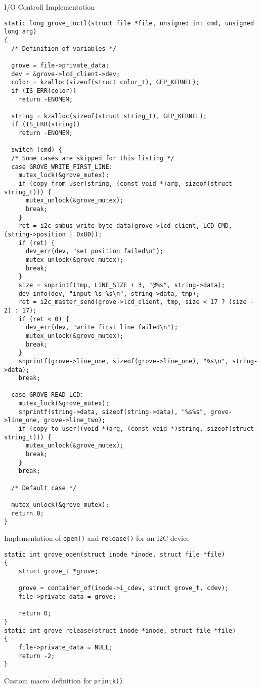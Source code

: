 \begin{listing} [H]
    \caption{I/O Controll Implementation}
    \label{lst:ioctl}
    \begin{verbatim}
static long grove_ioctl(struct file *file, unsigned int cmd, unsigned long arg)
{
  /* Definition of variables */

  grove = file->private_data;
  dev = &grove->lcd_client->dev;
  color = kzalloc(sizeof(struct color_t), GFP_KERNEL);
  if (IS_ERR(color))
    return -ENOMEM;

  string = kzalloc(sizeof(struct string_t), GFP_KERNEL);
  if (IS_ERR(string))
    return -ENOMEM;

  switch (cmd) {
  /* Some cases are skipped for this listing */
  case GROVE_WRITE_FIRST_LINE:
    mutex_lock(&grove_mutex);
    if (copy_from_user(string, (const void *)arg, sizeof(struct string_t))) {
      mutex_unlock(&grove_mutex);
      break;
    }
    ret = i2c_smbus_write_byte_data(grove->lcd_client, LCD_CMD, (string->position | 0x80));
    if (ret) {
      dev_err(dev, "set position failed\n");
      mutex_unlock(&grove_mutex);
      break;
    }
    size = snprintf(tmp, LINE_SIZE + 3, "@%s", string->data);
    dev_info(dev, "input %s %s\n", string->data, tmp);
    ret = i2c_master_send(grove->lcd_client, tmp, size < 17 ? (size - 2) : 17);
    if (ret < 0) {
      dev_err(dev, "write first line failed\n");
      mutex_unlock(&grove_mutex);
      break;
    }
    snprintf(grove->line_one, sizeof(grove->line_one), "%s\n", string->data);
    break;

  case GROVE_READ_LCD:
    mutex_lock(&grove_mutex);
    snprintf(string->data, sizeof(string->data), "%s%s", grove->line_one, grove->line_two);
    if (copy_to_user((void *)arg, (const void *)string, sizeof(struct string_t))) {
      mutex_unlock(&grove_mutex);
      break;
    }
    break;

  /* Default case */

  mutex_unlock(&grove_mutex);
  return 0;
}
    \end{verbatim}
\end{listing}


\begin{listing} [H]
    \caption{Implementation of \texttt{open()} and \texttt{release()} for an I2C device}
    \label{lst:open}
    \begin{verbatim}
static int grove_open(struct inode *inode, struct file *file)
{
	struct grove_t *grove;

	grove = container_of(inode->i_cdev, struct grove_t, cdev);
	file->private_data = grove;

	return 0;
}    
static int grove_release(struct inode *inode, struct file *file)
{
    file->private_data = NULL;
    return -2;
}
    \end{verbatim}
\end{listing}



\begin{listing} [ht]
	\caption{Custom macro definition for \texttt{printk()}}
	\label{lst:printk-macro}
	\begin{verbatim}

	\end{verbatim}
\end{listing}

